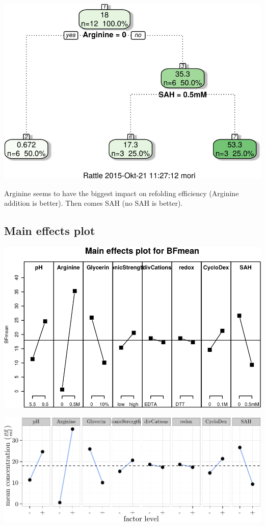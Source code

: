 \documentclass[]{article}
\begin{document}
\includegraphics{analysis_files/figure-latex/unnamed-chunk-3-1.pdf}

Arginine seems to have the biggest impact on refolding efficiency
(Arginine addition is better). Then comes SAH (no SAH is better).

\subsection{Main effects plot}\label{main-effects-plot}

\includegraphics{analysis_files/figure-latex/unnamed-chunk-4-1.pdf}

\includegraphics{analysis_files/figure-latex/unnamed-chunk-5-1.pdf}
\end{document}
